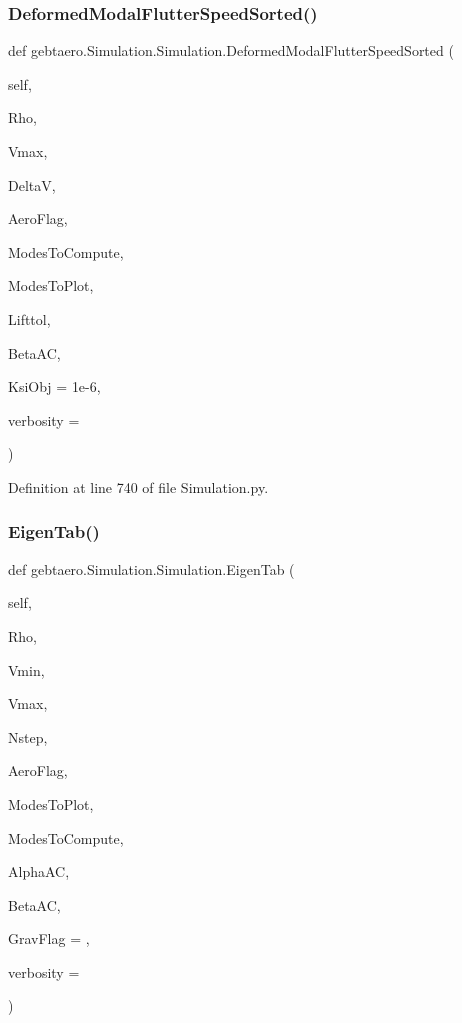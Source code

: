 \subsubsection{\texorpdfstring{Deformed\+Modal\+Flutter\+Speed\+Sorted()}{DeformedModalFlutterSpeedSorted()}}
{\footnotesize\ttfamily def gebtaero.\+Simulation.\+Simulation.\+Deformed\+Modal\+Flutter\+Speed\+Sorted (\begin{DoxyParamCaption}\item[{}]{self,  }\item[{}]{Rho,  }\item[{}]{Vmax,  }\item[{}]{DeltaV,  }\item[{}]{Aero\+Flag,  }\item[{}]{Modes\+To\+Compute,  }\item[{}]{Modes\+To\+Plot,  }\item[{}]{Lifttol,  }\item[{}]{Beta\+AC,  }\item[{}]{Ksi\+Obj = {\ttfamily 1e-\/6},  }\item[{}]{verbosity = {} }\end{DoxyParamCaption})}



Definition at line 740 of file Simulation.\+py.

\mbox{\label{classgebtaero_1_1_simulation_1_1_simulation_a2907ad4a52664321ef36ca2d05a5ea64}} 
\subsubsection{\texorpdfstring{Eigen\+Tab()}{EigenTab()}}
{\footnotesize\ttfamily def gebtaero.\+Simulation.\+Simulation.\+Eigen\+Tab (\begin{DoxyParamCaption}\item[{}]{self,  }\item[{}]{Rho,  }\item[{}]{Vmin,  }\item[{}]{Vmax,  }\item[{}]{Nstep,  }\item[{}]{Aero\+Flag,  }\item[{}]{Modes\+To\+Plot,  }\item[{}]{Modes\+To\+Compute,  }\item[{}]{Alpha\+AC,  }\item[{}]{Beta\+AC,  }\item[{}]{Grav\+Flag = {},  }\item[{}]{verbosity = {} }\end{DoxyParamCaption})}



